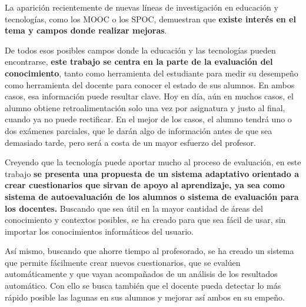 La aparición recientemente de nuevas líneas de investigación en educación y tecnologías, como los \acrshort{MOOC} o los \acrshort{SPOC}, demuestran que \textbf{existe interés en el tema y campos donde realizar mejoras}.

De todos esos posibles campos donde la educación y las tecnologías pueden encontrarse, \textbf{este trabajo se centra en la parte de la evaluación del conocimiento}, tanto como herramienta del estudiante para medir su desempeño como herramienta del docente para conocer el estado de sus alumnos. En ambos casos, esa información puede resultar clave. Hoy en día, aún en muchos casos, el alumno obtiene retroalimentación solo una vez por asignatura y justo al final, cuando ya no puede rectificar. En el mejor de los casos, el alumno tendrá uno o dos exámenes parciales, que le darán algo de información antes de que sea demasiado tarde, pero será a costa de un mayor esfuerzo del profesor.

Creyendo que la tecnología puede aportar mucho al proceso de evaluación, en este trabajo \textbf{se presenta una propuesta de un sistema adaptativo orientado a crear cuestionarios que sirvan de apoyo al aprendizaje, ya sea como sistema de autoevaluación de los alumnos o sistema de evaluación para los docentes.} 
Buscando que sea útil en la mayor cantidad de áreas del conocimiento y  contextos posibles, se ha creado para que sea fácil de usar, sin importar los conocimientos informáticos del usuario. 

Así mismo, buscando que ahorre tiempo al profesorado, se ha creado un sistema que permite fácilmente crear nuevos cuestionarios, que se evalúen automáticamente y que vayan acompañados de un análisis de los resultados automático. Con ello se busca también que el docente pueda detectar lo más rápido posible las lagunas en sus alumnos y mejorar así ambos en su empeño.





